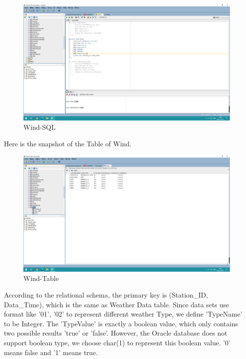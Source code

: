\documentclass[]{article}
\begin{document}
	\begin{figure}[H]
		\centering
		\includegraphics[width=1\linewidth]{../d3-p/wind-sql}
		\caption{Wind-SQL}
		\label{fig:wind-sql}
	\end{figure}
	
	\noindent Here is the snapshot of the Table of Wind. \\
	
	\begin{figure}[H]
		\centering
		\includegraphics[width=1\linewidth]{../d3-p/wind}
		\caption{Wind-Table}
		\label{fig:wind}
	\end{figure}

	\noindent According to the relational schema, the primary key is (Station\_ID, Data\_Time), which is the same as Weather Data table. Since data sets use format like '01', '02' to represent different weather Type, we define 'TypeName' to be Integer. The 'TypeValue' is exactly a boolean value, which only contains two possible results 'true' or 'false'. However, the Oracle database does not support boolean type, we choose char(1) to represent this boolean value. '0' means false and '1' means true.  \\
	
\end{document}
